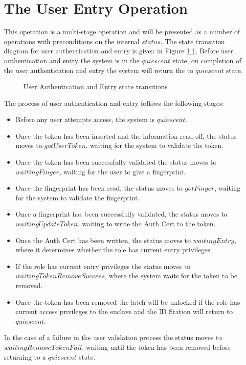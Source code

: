 \chapter{The User Entry Operation}
\label{sec:UserEntry}

\label{sec:userEntry}
This operation is a multi-stage operation and will be presented as 
a number of operations with preconditions on the internal $status$.
The state transition diagram for user authentication and entry is
given in Figure \ref{fig:userEntry}. Before user authentication and
entry the system is in the $quiescent$ state, on completion of the
user authentication and entry the system will return the to
$quiescent$ state.

\begin{figure}[htbp]
  \begin{center}
    \leavevmode
    \caption{User Authentication and Entry state transitions}
    \label{fig:userEntry}
  \end{center}
\end{figure}

The process of user authentication and entry follows the following
stages:

\begin{itemize}
\item
Before any user attempts access, the system is $quiescent$.
\item
Once the token has been inserted and the information read off,
the status moves to $gotUserToken$, waiting for the system to validate
the token. 
\item
Once the token has been successfully validated the 
status moves to $waitingFinger$,
waiting for the user to give a fingerprint.
\item
Once the fingerprint has been read, the status moves to $gotFinger$,
waiting for the system to validate the fingerprint.
\item
Once a fingerprint has been successfully validated,
the status moves to $waitingUpdateToken$,
waiting to write the Auth Cert to the token.
\item
Once the Auth Cert has been written, the status moves to
$waitingEntry$, where it determines whether the role has
current entry privileges.
\item
If the role has current entry privileges the status moves to
$waitingTokenRemoveSuccess$, where the system waits for 
the token to be removed.
\item
Once the token has been removed
the latch will be unlocked if the role has current access privileges
to the enclave and the ID Station will return to $quiescent$.
\end{itemize}
In the case of a failure in the user validation process the status
moves to  $waitingRemoveTokenFail$, waiting until the token has been removed before returning to a
$quiescent$ state.

